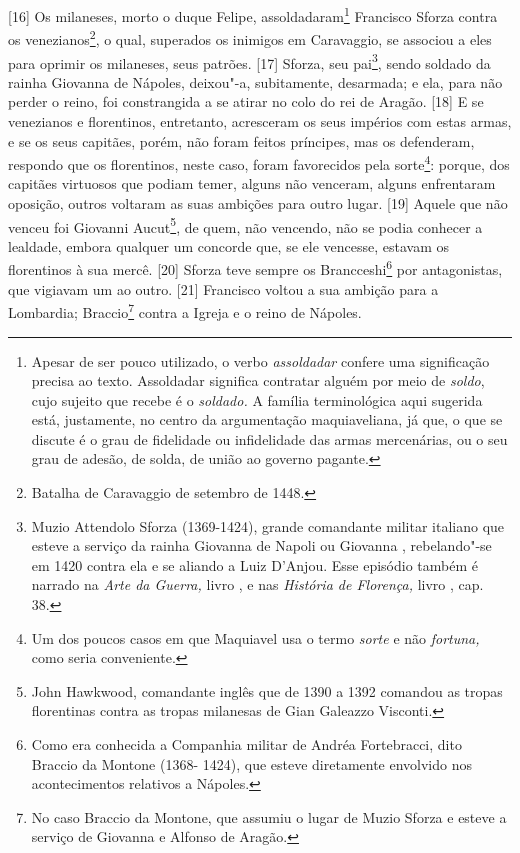 {[}16{]} Os milaneses, morto o duque Felipe, assoldadaram\footnote{Apesar
  de ser pouco utilizado, o verbo \emph{assoldadar} confere uma
  significação precisa ao texto. Assoldadar significa contratar alguém
  por meio de \emph{soldo}, cujo sujeito que recebe é o \emph{soldado.}
  A família terminológica aqui sugerida está, justamente, no centro da
  argumentação maquiaveliana, já que, o que se discute é o grau de
  fidelidade ou infidelidade das armas mercenárias, ou o seu grau de
  adesão, de solda, de união ao governo pagante.} Francisco Sforza
contra os venezianos\footnote{Batalha de Caravaggio de setembro de 1448.},
o qual, superados os inimigos em Caravaggio, se associou a eles para
oprimir os milaneses, seus patrões. {[}17{]} Sforza, seu pai\footnote{Muzio
  Attendolo Sforza (1369-1424), grande comandante militar italiano que
  esteve a serviço da rainha Giovanna de Napoli ou Giovanna ,
  rebelando"-se em 1420 contra ela e se aliando a Luiz  D'Anjou. Esse
  episódio também é narrado na \emph{Arte da Guerra,} livro , e nas
  \emph{História de Florença,} livro , cap. 38.}, sendo soldado da
rainha Giovanna de Nápoles, deixou"-a, subitamente, desarmada; e ela,
para não perder o reino, foi constrangida a se atirar no colo do rei de
Aragão. {[}18{]} E se venezianos e florentinos, entretanto, acresceram
os seus impérios com estas armas, e se os seus capitães, porém, não
foram feitos príncipes, mas os defenderam, respondo que os florentinos,
neste caso, foram favorecidos pela sorte\footnote{Um dos poucos casos em
  que Maquiavel usa o termo \emph{sorte} e não \emph{fortuna,} como
  seria conveniente.}: porque, dos capitães virtuosos que podiam temer,
alguns não venceram, alguns enfrentaram oposição, outros voltaram as
suas ambições para outro lugar. {[}19{]} Aquele que não venceu foi
Giovanni Aucut\footnote{John Hawkwood, comandante inglês que de 1390 a
  1392 comandou as tropas florentinas contra as tropas milanesas de Gian
  Galeazzo Visconti.}, de quem, não vencendo, não se podia conhecer a
lealdade, embora qualquer um concorde que, se ele vencesse, estavam os
florentinos à sua mercê. {[}20{]} Sforza teve sempre os
Brancceshi\footnote{Como era conhecida a Companhia militar de Andréa
  Fortebracci, dito Braccio da Montone (1368- 1424), que esteve
  diretamente envolvido nos acontecimentos relativos a Nápoles.} por
antagonistas, que vigiavam um ao outro. {[}21{]} Francisco voltou a sua
ambição para a Lombardia; Braccio\footnote{No caso Braccio da Montone,
  que assumiu o lugar de Muzio Sforza e esteve a serviço de Giovanna 
  e Alfonso de Aragão.} contra a Igreja e o reino de Nápoles.


